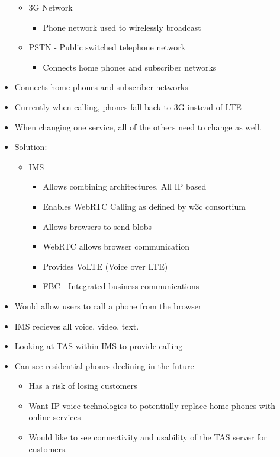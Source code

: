 \documentclass[12pt]{article}
\begin{document}
\begin{itemize}
\begin{itemize}
\begin{itemize}
		\end{itemize}		
		\item 3G Network
		\begin{itemize}
			\item Phone network used to wirelessly broadcast
		\end{itemize}		
		\item PSTN - Public switched telephone network
		\begin{itemize}
			\item Connects home phones and subscriber networks
		\end{itemize}	
	\end{itemize}	
	\item Connects home phones and subscriber networks
	\item Currently when calling, phones fall back to 3G instead of LTE
	\item When changing one service, all of the others need to change as well.
	\item Solution:
	\begin{itemize}
		\item IMS
		\begin{itemize}
			\item Allows combining architectures. All IP based
			\item Enables WebRTC Calling as defined by w3c consortium
			\item Allows browsers to send blobs
			\item WebRTC allows browser communication
			\item Provides VoLTE (Voice over LTE)
			\item FBC - Integrated business communications
		\end{itemize}	
	\end{itemize}	
	\item Would allow users to call a phone from the browser
	\item IMS recieves all voice, video, text.
	\item Looking at TAS within IMS to provide calling
	\item Can see residential phones declining in the future
	\begin{itemize}
		\item Has a risk of losing customers
		\item Want IP voice technologies to potentially replace home phones with online services
		\item Would like to see connectivity and usability of the TAS server for customers.

\end{itemize}
\end{itemize}
\end{document}

